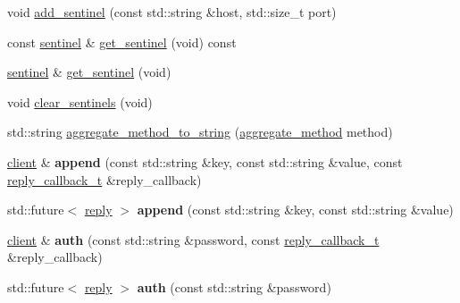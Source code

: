 \begin{DoxyCompactItemize}
\item 
void \hyperlink{classcpp__redis_1_1client_a7050eb52856decad9ab2060a139f4b48}{add\+\_\+sentinel} (const std\+::string \&host, std\+::size\+\_\+t port)
\item 
const \hyperlink{classcpp__redis_1_1sentinel}{sentinel} \& \hyperlink{classcpp__redis_1_1client_a9f94860dad26bca4e860a56ca8aefe36}{get\+\_\+sentinel} (void) const
\item 
\hyperlink{classcpp__redis_1_1sentinel}{sentinel} \& \hyperlink{classcpp__redis_1_1client_a9457cea98f061ce6071f897ba8605813}{get\+\_\+sentinel} (void)
\item 
void \hyperlink{classcpp__redis_1_1client_a68cd15d1cc30302237e3a400e2ac43f5}{clear\+\_\+sentinels} (void)
\item 
std\+::string \hyperlink{classcpp__redis_1_1client_ae0f65eac1bfea8711be4d2778d7c7697}{aggregate\+\_\+method\+\_\+to\+\_\+string} (\hyperlink{classcpp__redis_1_1client_aa197ca5b36da793c701d3ba388ec4946}{aggregate\+\_\+method} method)
\item 
\mbox{\label{classcpp__redis_1_1client_ad60647638d8758103e98894457652b84}} 
\hyperlink{classcpp__redis_1_1client}{client} \& {\bfseries append} (const std\+::string \&key, const std\+::string \&value, const \hyperlink{classcpp__redis_1_1client_a061a1140d36d2eaeda82b09a0bb3f9f2}{reply\+\_\+callback\+\_\+t} \&reply\+\_\+callback)
\item 
\mbox{\label{classcpp__redis_1_1client_a3e50dddad0b4c9eca58d970bdc4e78da}} 
std\+::future$<$ \hyperlink{classcpp__redis_1_1reply}{reply} $>$ {\bfseries append} (const std\+::string \&key, const std\+::string \&value)
\item 
\mbox{\label{classcpp__redis_1_1client_a3ee834ca9c0810d2eafcf04de9dc0670}} 
\hyperlink{classcpp__redis_1_1client}{client} \& {\bfseries auth} (const std\+::string \&password, const \hyperlink{classcpp__redis_1_1client_a061a1140d36d2eaeda82b09a0bb3f9f2}{reply\+\_\+callback\+\_\+t} \&reply\+\_\+callback)
\item 
\mbox{\label{classcpp__redis_1_1client_a899b98d4d6da0ffdf8780933fe088fd1}} 
std\+::future$<$ \hyperlink{classcpp__redis_1_1reply}{reply} $>$ {\bfseries auth} (const std\+::string \&password)
\item 

\end{DoxyCompactItemize}
